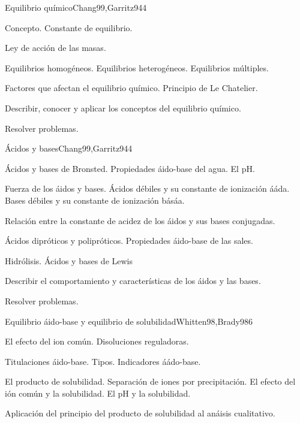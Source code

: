 \begin{syllabus}
\begin{unit}{Equilibrio químico}{Chang99,Garritz94}{4}
\begin{topics}
      \item Concepto. Constante de equilibrio.
      \item Ley de acción de las masas.
      \item Equilibrios homogéneos. Equilibrios heterogéneos. Equilibrios múltiples.
      \item Factores que afectan el equilibrio químico. Principio de Le Chatelier.
    \end{topics}
   \begin{learningoutcomes}
      \item Describir, conocer y aplicar los conceptos del equilibrio químico.
      \item Resolver problemas.
   \end{learningoutcomes}
\end{unit}

\begin{unit}{Ácidos y bases}{Chang99,Garritz94}{4}
\begin{topics}
	\item Ácidos y bases de Bronsted. Propiedades áido-base del agua. El pH.
	\item Fuerza de los áidos y bases. Ácidos débiles y su constante de ionización ááda. Bases débiles y su constante de ionización básáa. 
	\item Relación entre la constante de acidez de los áidos y sus bases conjugadas.
	\item Ácidos dipróticos y polipróticos. Propiedades áido-base de las sales.
	\item Hidrólisis.  Ácidos y bases de Lewis
\end{topics}

\begin{learningoutcomes}
	\item Describir el comportamiento y características de los áidos y las bases.
	\item Resolver problemas.
\end{learningoutcomes}
\end{unit}

\begin{unit}{Equilibrio áido-base y equilibrio de solubilidad}{Whitten98,Brady98}{6}
\begin{topics}
	\item El efecto del ion común. Disoluciones reguladoras.
	\item Titulaciones áido-base. Tipos.  Indicadores áádo-base.
	\item El producto de solubilidad. Separación de iones por precipitación. El efecto del ión común y la solubilidad. El pH y la solubilidad.
	\item Aplicación del principio del producto de solubilidad al anáisis cualitativo.
\end{topics}


\end{unit}
\end{syllabus}
